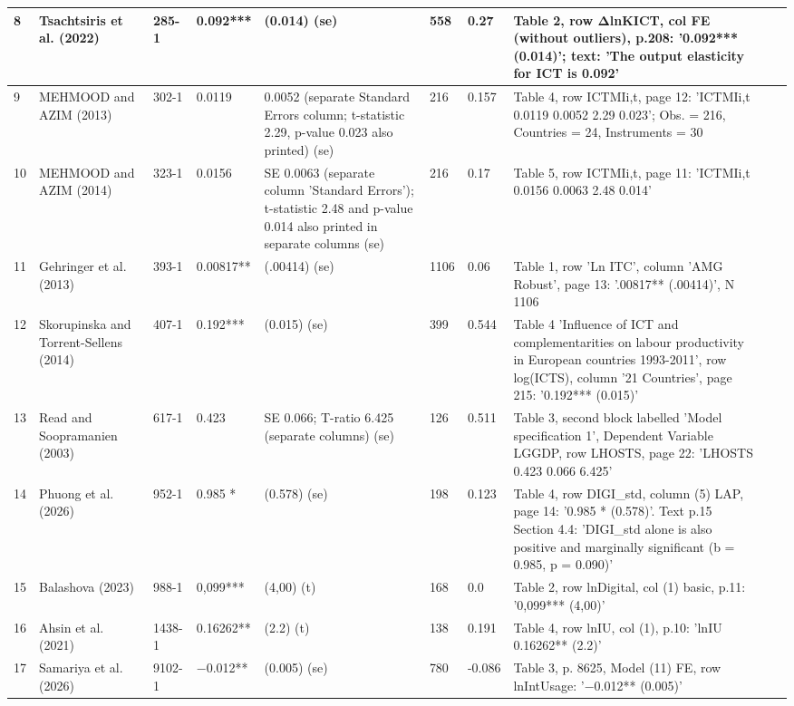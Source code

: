 \documentclass[10pt,a4paper]{article}
\begin{document}
\begin{longtable}{@{}p{0.6cm}p{2.7cm}p{1.6cm}p{2.0cm}p{1.2cm}p{1.0cm}p{0.9cm}p{4.8cm}p{1.5cm}p{1.6cm}@{}}
8 & Tsachtsiris et al. (2022) & 285-1 & 0.092*** & (0.014) (se) & 558 & 0.27 & Table 2, row ΔlnKICT, col FE (without outliers), p.208: '0.092*** (0.014)'; text: 'The output elasticity for ICT is 0.092' & & \\ \midrule
9 & MEHMOOD and AZIM (2013) & 302-1 & 0.0119 & 0.0052 (separate Standard Errors column; t-statistic 2.29, p-value 0.023 also printed) (se) & 216 & 0.157 & Table 4, row ICTMIi,t, page 12: 'ICTMIi,t 0.0119 0.0052 2.29 0.023'; Obs. = 216, Countries = 24, Instruments = 30 & & \\ \midrule
10 & MEHMOOD and AZIM (2014) & 323-1 & 0.0156 & SE 0.0063 (separate column 'Standard Errors'); t-statistic 2.48 and p-value 0.014 also printed in separate columns (se) & 216 & 0.17 & Table 5, row ICTMIi,t, page 11: 'ICTMIi,t 0.0156 0.0063 2.48 0.014' & & \\ \midrule
11 & Gehringer et al. (2013) & 393-1 & 0.00817** & (.00414) (se) & 1106 & 0.06 & Table 1, row 'Ln ITC', column 'AMG Robust', page 13: '.00817** (.00414)', N 1106 & & \\ \midrule
12 & Skorupinska and Torrent-Sellens (2014) & 407-1 & 0.192*** & (0.015) (se) & 399 & 0.544 & Table 4 'Influence of ICT and complementarities on labour productivity in European countries 1993-2011', row log(ICTS), column '21 Countries', page 215: '0.192*** (0.015)' & & \\ \midrule
13 & Read and Soopramanien (2003) & 617-1 & 0.423 & SE 0.066; T-ratio 6.425 (separate columns) (se) & 126 & 0.511 & Table 3, second block labelled 'Model specification 1', Dependent Variable LGGDP, row LHOSTS, page 22: 'LHOSTS 0.423 0.066 6.425' & & \\ \midrule
14 & Phuong et al. (2026) & 952-1 & 0.985 * & (0.578) (se) & 198 & 0.123 & Table 4, row DIGI\_std, column (5) LAP, page 14: '0.985 * (0.578)'. Text p.15 Section 4.4: 'DIGI\_std alone is also positive and marginally significant (b = 0.985, p = 0.090)' & & \\ \midrule
15 & Balashova (2023) & 988-1 & 0,099*** & (4,00) (t) & 168 & 0.0 & Table 2, row lnDigital, col (1) basic, p.11: '0,099*** (4,00)' & & \\ \midrule
16 & Ahsin et al. (2021) & 1438-1 & 0.16262** & (2.2) (t) & 138 & 0.191 & Table 4, row lnIU, col (1), p.10: 'lnIU 0.16262** (2.2)' & & \\ \midrule
17 & Samariya et al. (2026) & 9102-1 & −0.012** & (0.005) (se) & 780 & -0.086 & Table 3, p. 8625, Model (11) FE, row lnIntUsage: '−0.012** (0.005)' & & \\ \midrule

\end{longtable}
\end{document}
